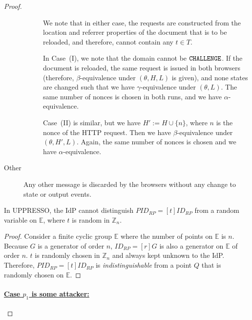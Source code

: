 \begin{proof}
\begin{description}
\begin{description}
        We note that in either case, the requests are constructed from
        the location and referrer properties of the document that is to
        be reloaded, and therefore, cannot contain any $t\in T$.
  
        In Case~(I), we note that the domain cannot be
        $\mathtt{CHALLENGE}$. If the document is reloaded, the same 
        request is issued in both browsers (therefore,
        $\beta$-equivalence under $(\theta, H, L)$ is given), and 
        none states are changed such that we have
        $\gamma$-equivalence under $(\theta, L)$. The same number of
        nonces is chosen in both runs, and we have
        $\alpha$-equivalence.
  
        Case~(II) is similar, but we have $H' := H \cup \{n\}$, where
        $n$ is the nonce of the HTTP request. 
        Then we have $\beta$-equivalence under
        $(\theta,H',L)$. Again, the same number of nonces is chosen and
        we have $\alpha$-equivalence. 
        \end{description}
      \item[Other] Any other message is discarded by the browsers 
        without any change to state or output events.
    \end{description}
  
    \begin{lemma}\label{thm-idp-untraceability}
      In UPPRESSO, the IdP cannot distinguish 
      $PID_{RP} = [t]ID_{RP}$ from a random variable on 
      $\mathbb{E}$, where $t$ is random in $\mathbb{Z}_n$.
    \end{lemma}
    \begin{proof}
      Consider a finite cyclic group $\mathbb{E}$ where the 
      number of points on $\mathbb{E}$ is $n$. Because $G$ is a 
      generator of order $n$, $ID_{RP} = [r]G$ is also a 
      generator on $\mathbb{E}$ of order $n$. $t$ is randomly 
      chosen in $\mathbb{Z}_n$ and always kept unknown to the 
      IdP. Therefore, $PID_{RP} = [t]ID_{RP}$ is 
      \emph{indistinguishable} from a point $Q$ that is randomly 
      chosen on $\mathbb{E}$.
    \end{proof}
  
    \paragraph{\underline{Case $p_1$ is some attacker:}}
    

\end{proof}
